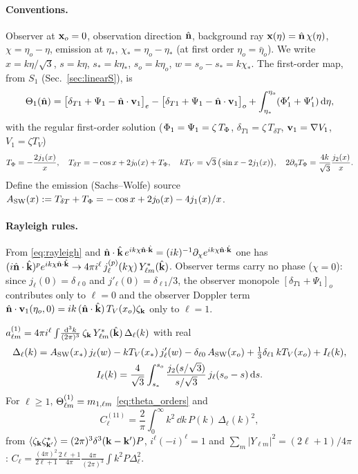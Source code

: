 \paragraph{Conventions.}  Observer at $\mathbf x_o=0$, observation direction $\hat{\mathbf n}$, background ray
$\mathbf x(\eta)=\hat{\mathbf n}\,\chi(\eta)$, $\chi=\eta_o-\eta$, emission at $\eta_*$, $\chi_*=\eta_o-\eta_*$ (at first order $\eta_o=\bar\eta_o$).  We write
$x=k\eta/\sqrt3$, $s=k\eta$, $s_*=k\eta_*$, $s_o=k\eta_o$, $w=s_o-s_*=k\chi_*$.  The first-order map, from $S_1$ (Sec.~\ref{sec:linearS}), is
\begin{equation}
\Theta_1(\hat{\mathbf n})=\big[\delta_{T1}+\Psi_1-\hat{\mathbf n}\cdot\mathbf v_1\big]_e-\big[\delta_{T1}+\Psi_1-\hat{\mathbf n}\cdot\mathbf v_1\big]_o
+\int_{\eta_*}^{\eta_o}(\Phi_1'+\Psi_1')\,\mathrm d\eta ,
\end{equation}
with the regular first-order solution ($\Phi_1=\Psi_1=\zeta\,T_\Phi$, $\delta_{T1}=\zeta\,T_{\delta T}$, $\mathbf v_1=\nabla V_1$, $V_1=\zeta T_V$)
\begin{equation}
T_\Phi=-\frac{2j_1(x)}{x},\quad T_{\delta T}=-\cos x+2j_0(x)+T_\Phi,\quad kT_V=\sqrt3\,\big(\sin x-2j_1(x)\big),\quad
2\partial_\eta T_\Phi=\frac{4k}{\sqrt3}\frac{j_2(x)}{x}.
\end{equation}
Define the emission (Sachs--Wolfe) source $A_{\rm SW}(x):=T_{\delta T}+T_\Phi=-\cos x+2j_0(x)-4j_1(x)/x$.

\paragraph{Rayleigh rules.}  From \eqref{eq:rayleigh} and $\hat{\mathbf n}\cdot\hat{\mathbf k}\,e^{ik\chi\hat{\mathbf n}\cdot\hat{\mathbf k}}=(ik)^{-1}\partial_\chi e^{ik\chi\hat{\mathbf n}\cdot\hat{\mathbf k}}$
one has
$(i\hat{\mathbf n}\cdot\hat{\mathbf k})^p e^{ik\chi\hat{\mathbf n}\cdot\hat{\mathbf k}}\to 4\pi i^\ell\,j_\ell^{(p)}(k\chi)\,Y^*_{\ell m}(\hat{\mathbf k})$.
Observer terms carry no phase ($\chi=0$): since $j_\ell(0)=\delta_{\ell0}$ and $j'_\ell(0)=\delta_{\ell1}/3$, the observer
monopole $[\delta_{T1}+\Psi_1]_o$ contributes only to $\ell=0$ and the observer Doppler term
$\hat{\mathbf n}\cdot\mathbf v_1(\eta_o,0)=i k\,(\hat{\mathbf n}\cdot\hat{\mathbf k})\,T_V(x_o)\zeta_\mathbf k$ only to $\ell=1$.

\begin{proposition}\label{prop:Delta}
$a^{(1)}_{\ell m}=4\pi i^\ell\int\!\frac{\mathrm d^3k}{(2\pi)^3}\,\zeta_\mathbf k\,Y^*_{\ell m}(\hat{\mathbf k})\,\Delta_\ell(k)$ with real
\begin{gather}
\Delta_\ell(k)=A_{\rm SW}(x_*)\,j_\ell(w)-kT_V(x_*)\,j'_\ell(w)-\delta_{\ell0}\,A_{\rm SW}(x_o)+\tfrac13\delta_{\ell1}\,kT_V(x_o)+I_\ell(k),\nonumber\\
I_\ell(k)=\frac{4}{\sqrt3}\int_{s_*}^{s_o}\frac{j_2(s/\sqrt3)}{s/\sqrt3}\,j_\ell(s_o-s)\,\mathrm d s .
\end{gather}
For $\ell\ge1$, $\Theta^{(1)}_{\ell m}=m_{1,\ell m}$ \eqref{eq:theta_orders} and
\begin{equation}
C^{(11)}_\ell=\frac{2}{\pi}\int_0^\infty k^2\,\dd k\,P(k)\,\Delta_\ell(k)^2 ,
\end{equation}
from $\langle \zeta_\mathbf k\zeta^*_{\mathbf k'}\rangle=(2\pi)^3\delta^3(\mathbf k-\mathbf k')P$, $i^\ell(-i)^\ell=1$ and $\sum_m|Y_{\ell m}|^2=(2\ell+1)/4\pi$:
$C_\ell=\frac{(4\pi)^2}{2\ell+1}\frac{2\ell+1}{4\pi}\frac{4\pi}{(2\pi)^3}\int k^2P\Delta_\ell^2$.
\end{proposition}

